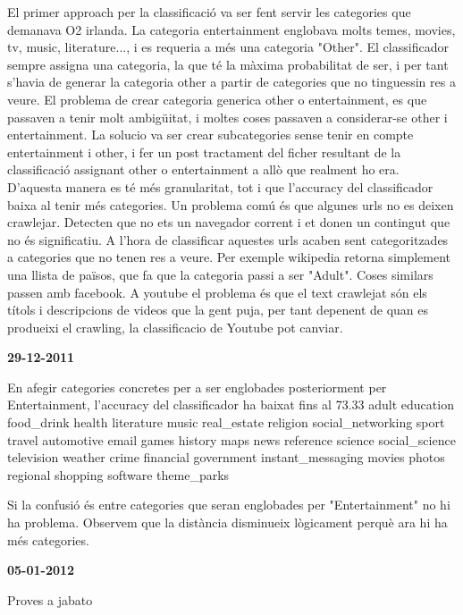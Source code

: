 El primer approach per la classificació va ser fent servir les categories que demanava O2 irlanda. La categoria entertainment englobava molts temes, movies, tv, music,
literature..., i es requeria a més una categoria "Other". El classificador sempre assigna una categoria, la que té la màxima probabilitat de ser, i per tant s'havia 
de generar la categoria other a partir de categories que no tinguessin res a veure.
El problema de crear categoria generica other o entertainment, es que passaven a tenir molt ambigüitat, i moltes coses passaven a considerar-se other i entertainment.
La solucio va ser crear subcategories sense tenir en compte entertainment i other, i fer un post tractament del ficher resultant de la classificació assignant other o 
entertainment a allò que realment ho era. D'aquesta manera es té més granularitat, tot i que l'accuracy del classificador baixa al tenir més categories.
Un problema comú és que algunes urls no es deixen crawlejar. Detecten que no ets un navegador corrent i et donen un contingut que no és significatiu. A l'hora de
classificar aquestes urls acaben sent categoritzades a categories que no tenen res a veure. Per exemple wikipedia retorna simplement una llista de països, que fa que 
la categoria passi a ser "Adult". Coses similars passen amb facebook. 
A youtube el problema és que el text crawlejat són els títols i descripcions de videos que la gent puja, per tant depenent de quan es produeixi el crawling, la
classificacio de Youtube pot canviar.


\textbf{29-12-2011}

  En afegir categories concretes per a ser englobades posteriorment per Entertainment, l'accuracy del classificador ha baixat fins al 73.33
  adult       education  food\_drink  health             literature  music   real\_estate  religion  social\_networking  sport        travel
  automotive  email      games       history            maps        news    reference    science   social\_science     television   weather
  crime       financial  government  instant\_messaging  movies      photos  regional     shopping  software           theme\_parks

  Si la confusió és entre categories que seran englobades per "Entertainment" no hi ha problema. 
  Observem que la distància disminueix lògicament perquè ara hi ha més categories.

\textbf{05-01-2012}
 
  Proves a jabato
